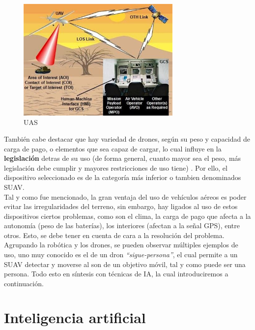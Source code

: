\begin{figure} [H]
	\begin{center}
	\includegraphics[height=6cm]{imagenes/cap1/7_drone_components.jpeg}
	\end{center}
	\caption[UAS]{UAS}
	\label{fig:drone_components}
\end{figure}

También cabe destacar que hay variedad de drones, según su peso y capacidad de carga de pago, o elementos que sea capaz de cargar, lo cual influye en la \textbf{legislación} detras de su uso (de forma general, cuanto mayor sea el peso, más legislación debe cumplir y mayores restricciones de uso tiene) \cite{drone-regulation}. Por ello, el dispositivo seleccionado es de la categoría más inferior o tambien denominados \ac{SUAV}.\\

Tal y como fue mencionado, la gran ventaja del uso de vehículos aéreos es poder evitar las irregularidades del terreno, sin embargo, hay ligados al uso de estos dispositivos ciertos problemas, como son el clima, la carga de pago que afecta a la autonomía (peso de las baterías), los interiores (afectan a la señal GPS), entre otros. Esto, se debe tener en cuenta de cara a la resolución del problema.\\

Agrupando la robótica y los drones, se pueden observar múltiples ejemplos de uso, uno muy conocido es el de un dron \emph{``sigue-persona''}, el cual permite a un \ac{SUAV} detectar y moverse al son de un objetivo móvil, tal y como puede ser una persona. Todo esto en síntesis con técnicas de \ac{IA}, la cual introduciremos a continuación.

\section{Inteligencia artificial}
\label{subsec:inteligencia_artificial}

